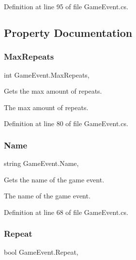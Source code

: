 Definition at line 95 of file Game\+Event.\+cs.



\subsection{Property Documentation}
\mbox{\label{class_game_event_a091a536003bfe1c09a4b84d724cf90d6}} 
\subsubsection{\texorpdfstring{Max\+Repeats}{MaxRepeats}}
{\footnotesize\ttfamily int Game\+Event.\+Max\+Repeats\hspace{0.3cm}{\ttfamily [get]}, {}}



Gets the max amount of repeats. 

The max amount of repeats.

Definition at line 80 of file Game\+Event.\+cs.

\mbox{\label{class_game_event_a9dcf75aa8906aeabdbc1039fe7968503}} 
\subsubsection{\texorpdfstring{Name}{Name}}
{\footnotesize\ttfamily string Game\+Event.\+Name\hspace{0.3cm}{\ttfamily [get]}, {}}



Gets the name of the game event. 

The name of the game event.

Definition at line 68 of file Game\+Event.\+cs.

\mbox{\label{class_game_event_aaa381ffa74bbae7bb3cf78994d1bb3ef}} 
\subsubsection{\texorpdfstring{Repeat}{Repeat}}
{\footnotesize\ttfamily bool Game\+Event.\+Repeat\hspace{0.3cm}{\ttfamily [get]}, {}}



